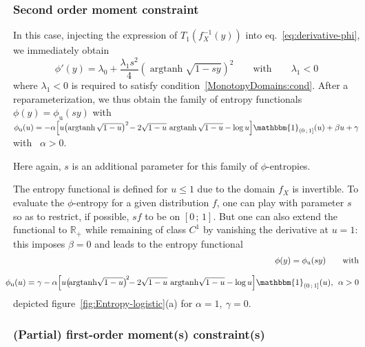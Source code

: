 \documentclass[entropy,article,submit,moreauthors,pdftex]{Definitions/mdpi}
\def\Rset{\mathbb{R}}%
\def\un{\mathbbm{1}}%
\def\argtanh{\operatorname{argtanh}}%
\def\u{\mathrm{u}}
\begin{document}

\subsubsection{Second order moment constraint}
\label{subsubsecapp:LogisticSecondOrder}

In this case,  injecting the expression of $T_1\left(  f_X^{-1}(y) \right)$ into
eq.~\eqref{eq:derivative-phi}, we immediately obtain
%
\[
\phi'(y) =  \lambda_0 +  \frac{\lambda_1 s^2}{4} \left(  \argtanh\sqrt{1 -  s y}
\right)^2 \qquad \mbox{with} \qquad \lambda_1 < 0
\]
%
where      $\lambda_1      <      0$       is      required      to      satisfy
condition~\ref{MonotonyDomains:cond}.   After  a   reparameterization,  we  thus
obtain  the  family  of  entropy  functionals  $\phi(y)  =  \phi_\u(s  y)$  with
$\phi_\u(u)  = -\alpha  \left[ u  \left(  \argtanh\sqrt{1-u} \right)^2  \!  -  2
  \sqrt{1-u} \,  \argtanh\sqrt{1-u} -  \log u  \right] \un_{\left( 0  \, ;  \, 1
  \right]}(u) + \beta u + \gamma$ with \ $\alpha > 0$.

Here again, $s$ is an additional parameter for this family of $\phi$-entropies.

The entropy  functional is  defined for  $u \le 1$  due to  the domain  $f_X$ is
invertible. To evaluate the $\phi$-entropy for a given distribution $f$, one can
play with parameter $s$ so as to restrict, if  possible, $s f$ to be on $[0 \, ;
  \, 1]$. But one can also extend the functional to $\Rset_+$ while remaining of
class $C^1$ by vanishing the derivative at $u = 1$: this imposes $\beta = 0$ and
leads to the entropy functional
%
\begin{eqnarray*}
  &&\hspace{-7mm}\phi(y) = \phi_\u(s y) \qquad \mbox{with}
 \\[2.5mm]  
  &&\hspace{-7mm}\phi_\u(u) = \gamma - \alpha \left[ u \left( \!
   \argtanh\!\sqrt{1-u} \right)^{\! 2} \!\!  - 2 \sqrt{1-u} \,
   \argtanh\!\sqrt{1-u} - \log u \right] \un_{\left( 0 \, ; \, 1 \right]}(u),
   \:\: \alpha > 0
\end{eqnarray*}
%
depicted figure~\ref{fig:Entropy-logistic}(a) for $\alpha = 1, \: \gamma = 0$.




\subsubsection{(Partial) first-order moment(s) constraint(s)}
\label{subsubsecapp:LogisticFirstPartial}
\end{document}
